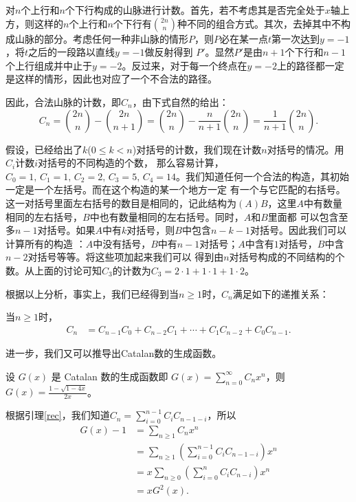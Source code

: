 对$n$个上行和$n$个下行构成的山脉进行计数。首先，若不考虑其是否完全处于$x$轴上
方，则这样的$n $个上行和$n$个下行有${2n\choose
n}$种不同的组合方式。其次，去掉其中不构成山脉的部分。考虑任何一种非山脉的情形$P
$，则$P$必在某一点$t$第一次达到$y=-1$，将$t$之后的一段路以直线$y=-1$做反射得到
$P'$。显然$P'
$是由$n+1$个下行和$n-1$个上行组成并中止于$y=-2$。反过来，对于每一个终点在$y=
-2$上的路径都一定是这样的情形，因此也对应了一个不合法的路径。

因此，合法山脉的计数，即$C_n$，由下式自然的给出：
\[C_n ={2n\choose n}-{2n \choose n+1}={2n\choose n}-\frac{n}{n+1}{2n\choose
n}=\frac 1{n+1}{2n\choose n}.
\]

假设，已经给出了$k$($0\leq k<
n$)对括号的计数，我们现在计数$n$对括号的情况。用$C_i$计数$i$对括号的不同构造的个数，
那么容易计算，$C_0=1, \,C_1=1,\,C_2=2,\,C_3=5,\,C_4=14
$。我们知道任何一个合法的构造，其初始一定是一个左括号。而在这个构造的某一个地方一定
有一个与它匹配的右括号。这一对括号里面左右括号的数目是相同的，记此结构为$(A)
B$，这里$A$中有数量相同的左右括号，$B$中也有数量相同的左右括号。同时，$A$和$B$里面都
可以包含至多$n-
1$对括号。如果$A$中有$k$对括号，则$B$中包含$n-k-1$对括号。因此我们可以计算所有的构造
：$A$中没有括号，$B
$中有$n-1$对括号；$A$中含有$1$对括号，$B$中含$n-2$对括号等等。将这些项加起来我们可以
得到由$n
$对括号构成的不同结构的个数。从上面的讨论可知$C_3$的计数为$C_3=2\cdot
1 +1\cdot 1 +1\cdot 2$。

根据以上分析，事实上，我们已经得到当$n\geq
1$时，$C_n$满足如下的递推关系：
\begin{lem}\label{rec}
当$n\geq 1$时，
\begin{align*}
C_n&= C_{n-1} C_0+C_{n-2} C_1+\cdots +C_1 C_{n-2} +C_0 C_{n-1}.
\end{align*}
\end{lem}
进一步，我们又可以推导出Catalan数的生成函数。
\begin{thm}
设 $G(x)$ 是 Catalan 数的生成函数即
$G(x)=\sum\limits_{n=0}^{\infty}C_nx^n$，则
$G(x)=\frac{1-\sqrt{1-4x}}{2x}$。
\end{thm}
根据引理\ref{rec}，我们知道$C_n=\sum\limits_{i=0}^{n-1}C_iC_{n-1-i}$，所以
\begin{align*}
G(x)-1%
&=\sum_{n\ge1}C_nx^n\\
&=\sum_{n\ge1}\left(\sum_{i=0}^{n-1}C_iC_{n-1-i}\right)x^n\\%
&=x\sum_{n\ge0}\left(\sum_{i=0}^{n}C_iC_{n-i}\right)x^{n}\\
&=xG^2(x).%
\end{align*}

